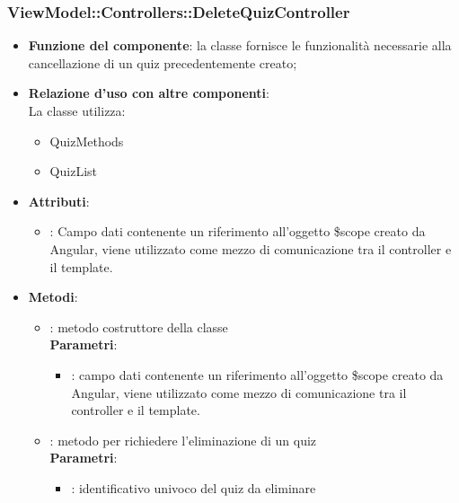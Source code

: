\subsubsection{ViewModel::Controllers::DeleteQuizController}
\begin{itemize}
\item\textbf{Funzione del componente}: la classe fornisce le funzionalità necessarie alla cancellazione di un quiz precedentemente creato;
	\item\textbf{Relazione d'uso con altre componenti}: \\
La classe utilizza:
	\begin{itemize}
		\item QuizMethods
		\item QuizList
	\end{itemize}
\item\textbf{Attributi}:
	\begin{itemize}
		\item{}: Campo dati contenente un riferimento all’oggetto \$scope creato da Angular, viene utilizzato come mezzo di comunicazione tra il controller e il template.\\
	\end{itemize}
\item\textbf{Metodi}:
	\begin{itemize}
		\item{}: metodo costruttore della classe\\
		\textbf{Parametri}:
			\begin{itemize}
				\item{}: campo dati contenente un riferimento all’oggetto \$scope creato da Angular, viene utilizzato come mezzo di comunicazione tra il controller e il template.\\
			\end{itemize}
		\item{}:  metodo per richiedere l'eliminazione di un quiz\\
		\textbf{Parametri}:
			\begin{itemize}
				\item{}: identificativo univoco del quiz da eliminare\\
			\end{itemize}
	\end{itemize}
\end{itemize}


